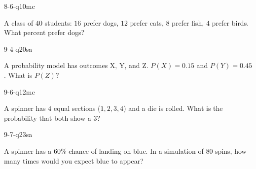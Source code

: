 \begin{practiceQuestion}{8-6-q10}{mc}
\begin{questionText}
A class of $40$ students: $16$ prefer dogs, $12$ prefer cats, $8$ prefer fish, $4$ prefer birds. What percent prefer dogs?
\end{questionText}
\end{practiceQuestion}

\begin{practiceQuestion}{9-4-q20}{sa}
\begin{questionText}
A probability model has outcomes X, Y, and Z. $P(X) = 0.15$ and $P(Y) = 0.45$. What is $P(Z)$?
\end{questionText}
\end{practiceQuestion}

\begin{practiceQuestion}{9-6-q12}{mc}
\begin{questionText}
A spinner has $4$ equal sections ($1, 2, 3, 4$) and a die is rolled. What is the probability that both show a $3$?
\end{questionText}
\end{practiceQuestion}

\begin{practiceQuestion}{9-7-q23}{sa}
\begin{questionText}
A spinner has a $60\%$ chance of landing on blue. In a simulation of $80$ spins, how many times would you expect blue to appear?
\end{questionText}
\end{practiceQuestion}
